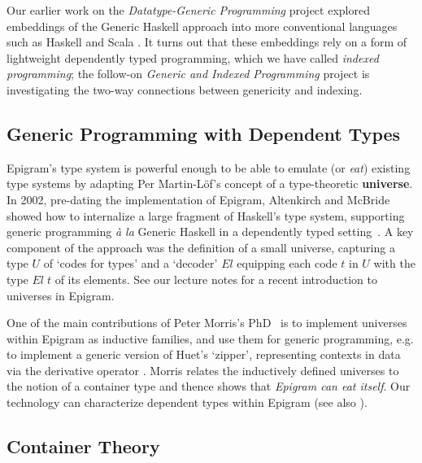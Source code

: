 \documentclass[a4paper]{article}
\begin{document}
Our earlier work on the \textit{Datatype-Generic Programming} project
explored embeddings of the Generic Haskell approach into more
conventional languages such as Haskell
\cite{Oliveira&Gibbons2005:TypeCase} and Scala
\cite{Oliveira*2008:Visitor}. It turns out that these embeddings
rely %
on a form of lightweight dependently typed programming, which
we have called \emph{indexed programming}; the follow-on
\textit{Generic and Indexed Programming} project is investigating the
two-way connections between genericity and indexing.


\subsection*{Generic Programming with Dependent Types}
\label{sec:gener-progr-with}

Epigram's type system is powerful enough to be able to emulate (or
\emph{eat}) existing type systems by adapting Per Martin-L\"of's
concept of a type-theoretic \textbf{universe}.
In 2002,
pre-dating the implementation of Epigram,
Altenkirch and McBride showed
how to
internalize a large fragment of
Haskell's type system, supporting generic programming
\emph{\`a la} Generic Haskell in a dependently typed
setting~\cite{alti:wcgp02}.
A key 
component of the approach was the
definition of a small universe,
capturing a type $U$ of `codes for types'
and a `decoder' $El$ equipping each code $t$ in $U$
with the type
$El\;t$ of its elements.
See our
lecture notes \cite{txa:ssgp06} for a recent introduction to
universes in Epigram.

One of the main contributions of Peter Morris's PhD~\cite{morris:PhD}
is to implement universes within Epigram as inductive families, and
use them for generic programming, e.g. to implement a generic version
of Huet's `zipper', representing contexts in data via the derivative
operator \cite{alti:regular}.  Morris relates the inductively defined
universes to the notion of a container type and thence shows that
\emph{Epigram can eat itself}.  Our technology can characterize
dependent types within Epigram (see also
\cite{alti:cats07,alti:jcats07}).

\subsection*{Container Theory}
\label{sec:container-theory}
\end{document}
